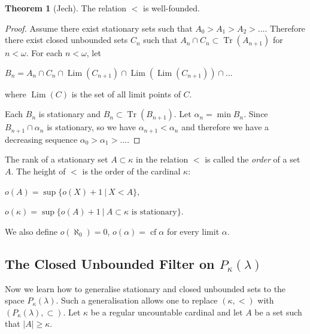 \documentclass[8pt]{article}
\theoremstyle{definition}
\theoremstyle{definition}
\newtheorem{theorem}{Theorem}[section]
\theoremstyle{definition}
\theoremstyle{definition}
\theoremstyle{definition}
\theoremstyle{definition}
\theoremstyle{definition}
\theoremstyle{definition}
\theoremstyle{definition}
\theoremstyle{definition}
\theoremstyle{definition}
\theoremstyle{definition}
\theoremstyle{definition}
\theoremstyle{definition}
\theoremstyle{question}
\begin{document}
\begin{theorem}[Jech]
  The relation $<$ is well-founded.
\end{theorem}

\begin{proof}
  Assume there exist stationary sets such that $A_0 > A_1 > A_2 > \dots$. Therefore there exist closed
  unbounded sets $C_n$ such that $A_n \cap C_n \subset \operatorname{Tr}(A_{n + 1})$ for $n < \omega$.
  For each $n < \omega$, let
  \begin{center}
    $B_n = A_n \cap C_n \cap \operatorname{Lim}(C_{n + 1}) \cap \operatorname{Lim}(\operatorname{Lim}(C_{n + 1})) \cap \dots$
  \end{center}
  where $\operatorname{Lim}(C)$ is the set of all limit points of $C$.

  Each $B_n$ is stationary and $B_n \subset \operatorname{Tr}(B_{n + 1})$. Let $\alpha_n = \min B_n$.
  Since $B_{n + 1} \cap \alpha_n$ is stationary, so we have $\alpha_{n + 1} < \alpha_n$ and therefore
  we have a decreasing sequence $\alpha_0 > \alpha_1 > \dots$.
\end{proof}

The rank of a stationary set $A \subset \kappa$ in the relation $<$ is called the \emph{order} of a set $A$.
The height of $<$ is the order of the cardinal $\kappa$:

\begin{center}
  $o(A) = \sup \{ o(X) +1 \: | \: X < A\}$,

  $o(\kappa) = \sup \{ o(A) + 1 \: | \: \text{$A \subset \kappa$ is stationary}\}$.
\end{center}

We also define $o(\aleph_0) = 0$, $o(\alpha) = \operatorname{cf} \alpha$ for every limit $\alpha$.

\subsection{The Closed Unbounded Filter on $P_{\kappa}(\lambda)$}

Now we learn how to generalise stationary and closed unbounded sets to the space $P_{\kappa}(\lambda)$.
Such a generalisation allows one to replace $(\kappa, <)$ with $(P_{\kappa}(\lambda), \subset)$.
Let $\kappa$ be a regular uncountable cardinal and let $A$ be a set such that $|A| \geq \kappa$.
\end{document}
